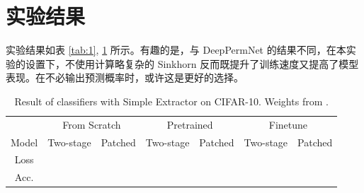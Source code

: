 \documentclass[a4paper]{article}
\begin{document}
\section{实验结果}
实验结果如表 \ref{tab:1}, \ref{tab:2} 所示。有趣的是，与 DeepPermNet \cite{deeppermnet} 的结果不同，在本实验的设置下，不使用计算略复杂的 Sinkhorn 反而既提升了训练速度又提高了模型表现。在不必输出预测概率时，或许这是更好的选择。

\begin{table}[H]
    \centering
    \caption{Result of our image concatenator in aid of anti-overfitting methods. WDX, C, and F.X stand for weight decay of $Xe-3$, random crop, and random flip with rate $0.X$, respectively. Train losses, test losses, and test accuracies are reported. Best results are in \textbf{bold face}.}
    \label{tab:1}
\end{table}

\begin{table}[H]
    \centering
    \begin{tabular}{ccccccc}
        \toprule
        &\multicolumn{2}{c}{From Scratch}&\multicolumn{2}{c}{Pretrained}&\multicolumn{2}{c}{Finetune}\\
        Model&Two-stage&Patched&Two-stage&Patched&Two-stage&Patched\\
        \midrule
        Loss\\
        Acc.\\
        \bottomrule

    \end{tabular}
    \caption{Result of classifiers with Simple Extractor on CIFAR-10. Weights from .}
    \label{tab:2}
\end{table}
\end{document}
